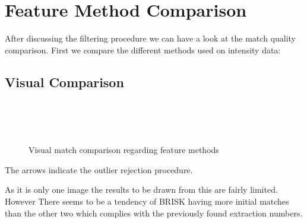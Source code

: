 \section{Feature Method Comparison}{
    After discussing the filtering procedure we can have a look at the match quality comparison. First we compare the different methods used on intensity data:

    \subsection{Visual Comparison}{

        \begin{figure}[htp]
            \centering
            \\
            \\
            \\
            \caption{Visual match comparison regarding feature methods}
            \label{fig:match_comparison_descriptors}
        \end{figure}
    
        The arrows indicate the outlier rejection procedure.
    
        As it is only one image the results to be drawn from this are fairly limited. However There seems to be a tendency of BRISK having more initial matches than the other two which complies with the previously found extraction numbers.
    }

}

